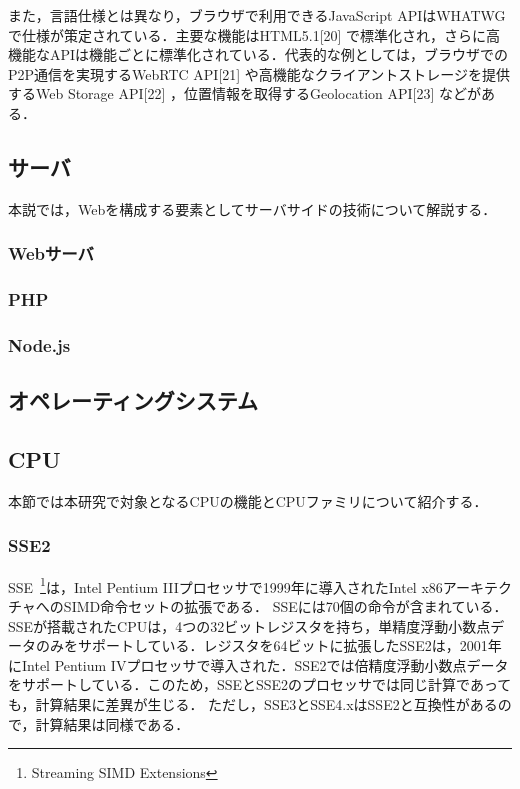 また，言語仕様とは異なり，ブラウザで利用できるJavaScript APIはWHATWGで仕様が策定されている．主要な機能はHTML5.1[20] で標準化され，さらに高機能なAPIは機能ごとに標準化されている．代表的な例としては，ブラウザでのP2P通信を実現するWebRTC API[21] や高機能なクライアントストレージを提供するWeb Storage API[22] ，位置情報を取得するGeolocation API[23] などがある． 
\subsection{サーバ}
本説では，Webを構成する要素としてサーバサイドの技術について解説する．
\subsubsection{Webサーバ}
\subsubsection{PHP}
\subsubsection{Node.js}
\subsection{オペレーティングシステム}
\subsection{CPU}
本節では本研究で対象となるCPUの機能とCPUファミリについて紹介する．
\subsubsection{SSE2}
SSE~\footnote{Streaming SIMD Extensions}は，Intel Pentium IIIプロセッサで1999年に導入されたIntel x86アーキテクチャへのSIMD命令セットの拡張である． SSEには70個の命令が含まれている．SSEが搭載されたCPUは，4つの32ビットレジスタを持ち，単精度浮動小数点データのみをサポートしている．レジスタを64ビットに拡張したSSE2は，2001年にIntel Pentium IVプロセッサで導入された．SSE2では倍精度浮動小数点データをサポートしている．このため，SSEとSSE2のプロセッサでは同じ計算であっても，計算結果に差異が生じる．
ただし，SSE3とSSE4.xはSSE2と互換性があるので，計算結果は同様である．
